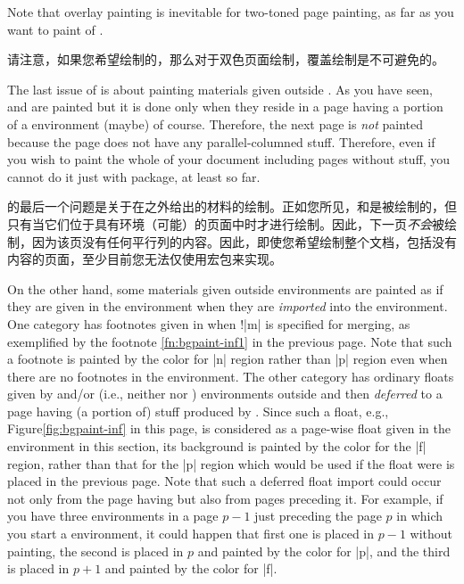 Note that overlay painting is inevitable for two-toned page painting, as
far as you want to paint \bground{} of \pwstuff.

请注意，如果您希望绘制\pwstuff{}的\bground{}，那么对于双色页面绘制，覆盖绘制是不可避免的。

The last issue of \bgpaint{} is about painting materials given outside
.  As you have seen, \Preenv{} and \postenv{} are painted but
it is done only when they reside in a page having a portion of a
 environment (maybe) of course.  Therefore, the next page is
\emph{not} painted because the page does not have any parallel-columned
stuff.  Therefore, even if you wish to paint the whole of your document
including pages without  stuff, you cannot do it just with
\Paracol{} package, at least so far.

\bgpaint{}的最后一个问题是关于在之外给出的材料的绘制。正如您所见，\Preenv{}和\postenv{}是被绘制的，但只有当它们位于具有环境（可能）的页面中时才进行绘制。因此，下一页\emph{不会}被绘制，因为该页没有任何平行列的内容。因此，即使您希望绘制整个文档，包括没有内容的页面，至少目前您无法仅使用\Paracol{}宏包来实现。

On the other hand, some materials given outside  environments
are painted as if they are given in the environment when they are
\emph{imported} into the environment.  One category has footnotes given in
\preenv{} when \!\footnotelayout!|{m}| is specified for merging, as
exemplified by the footnote \ref{fn:bgpaint-inf1} in the previous page.
Note that such a footnote is painted by the color for |n| region rather
than |p| region even when there are no footnotes in the 
environment.  The other category has ordinary floats given by 
and/or 
(i.e., neither  nor ) environments outside
 and then \emph{deferred} to a page having (a portion of)
stuff produced by .  Since such a float, e.g.,
Figure\Tie\ref{fig:bgpaint-inf} in this page, is considered as a page-wise
float given in the  environment in this section, its
background is painted by the color for the |f| region, rather than that
for the |p| region which would be used if the float were is placed in the
previous page.  Note that such a deferred float import could occur not
only from the page having \beginparacol{} but also from pages preceding
it.  For example, if you have three  environments in a page
$p-1$ just preceding the page $p$ in which you start a 
environment, it could happen that first one is placed in $p-1$ without
painting, the second is placed in $p$ and painted by the color for |p|,
and the third is placed in $p+1$ and painted by the color for |f|.

